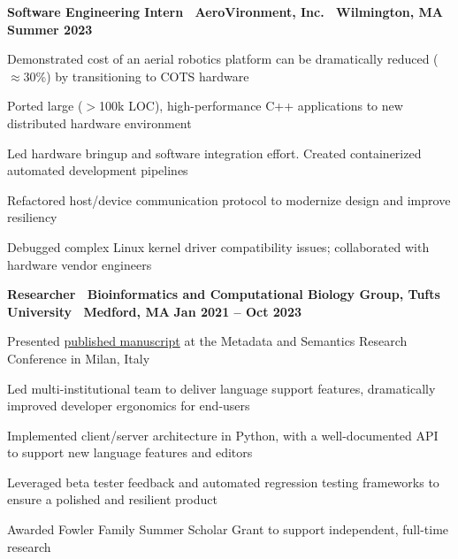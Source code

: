 \documentclass[10pt]{article}
\newenvironment{mylist}[1][]
{\itemize[nosep, wide=0pt, leftmargin=*, after=\strut]}
{\enditemize}
\begin{document}
\begin{minipage}[t]{\linewidth}
    \textbf{Software Engineering Intern \textbar \ AeroVironment, Inc. \textbar \ Wilmington, MA} \hfill \textbf{Summer 2023} 
    \begin{mylist}
        \item Demonstrated cost of an aerial robotics platform can be dramatically reduced ($\approx$30\%) by transitioning to COTS hardware
        \item Ported large ($>$100k LOC), high-performance C++ applications to new distributed hardware environment
        \item Led hardware bringup and software integration effort. Created containerized automated development pipelines
        \item Refactored host/device communication protocol to modernize design and improve resiliency
        \item Debugged complex Linux kernel driver compatibility issues; collaborated with hardware vendor engineers
    \end{mylist}
\end{minipage}

\begin{minipage}[t]{\linewidth}
    \textbf{Researcher \textbar \ Bioinformatics and Computational Biology Group, Tufts University \textbar \ Medford, MA} \hfill \textbf{Jan 2021 -- Oct 2023}
    \begin{mylist}
        \item Presented \href{https://link.springer.com/chapter/10.1007/978-3-031-65990-4_25}{published manuscript} at the Metadata and Semantics Research Conference in Milan, Italy
        \item Led multi-institutional team to deliver language support features, dramatically improved developer ergonomics for end-users
        \item Implemented client/server architecture in Python, with a well-documented API to support new language features and editors
        \item Leveraged beta tester feedback and automated regression testing frameworks to ensure a polished and resilient product
        \item Awarded Fowler Family Summer Scholar Grant to support independent, full-time research
    \end{mylist}
\end{minipage}
\end{document}
